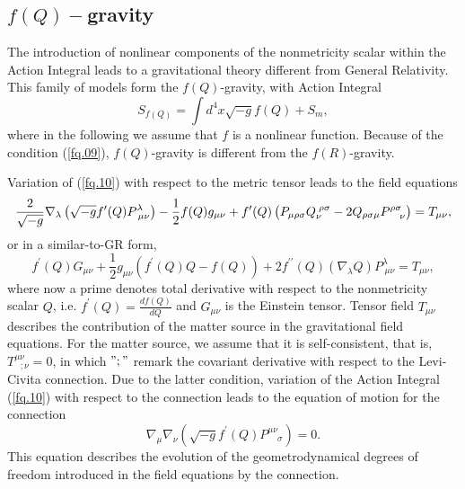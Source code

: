 \documentclass[onecolumn,superscriptaddress,secnumarabic,nobibnotes,aps,prd,nofootinbib,altaffilletter,11pt]{revtex4}
\begin{document}
\subsection{$f\left( Q\right) -$gravity}

The introduction of nonlinear components of the nonmetricity scalar within the Action Integral leads to a gravitational theory different from General Relativity. This family of models form the $f\left( Q\right) $-gravity, with
Action Integral \cite{fq1,fq2}%
\begin{equation}
S_{f\left( Q\right) }=\int d^{4}x\sqrt{-g}f\left( Q\right) +S_{m},
\label{fq.10}
\end{equation}%
where in the following we assume that $f$ is a nonlinear function. Because
of the condition (\ref{fq.09}), $f\left(Q\right) $-gravity is different from the $f\left(R\right) $-gravity.

Variation of (\ref{fq.10}) with respect to the metric tensor leads to the field equations 
\begin{equation}
\frac{2}{\sqrt{-g}}\nabla _{\lambda }\left( \sqrt{-g}f^{\prime }(Q)P_{\;\mu
\nu }^{\lambda }\right) -\frac{1}{2}f(Q)g_{\mu \nu }+f^{\prime }(Q)\left( P_{\mu \rho \sigma }Q_{\nu }^{\;\rho \sigma }-2Q_{\rho \sigma \mu }P_{%
\phantom{\rho\sigma}\nu }^{\rho \sigma }\right) =T_{\mu \nu },  \label{fq.11}
\end{equation}%
or in a similar-to-GR form,
\begin{equation}
f^{\prime }(Q)G_{\mu \nu }+\frac{1}{2}g_{\mu \nu }\left( f^{\prime
}(Q)Q-f(Q)\right) +2f^{\prime \prime }(Q)\left( \nabla _{\lambda }Q\right)
P_{\;\mu \nu }^{\lambda }=T_{\mu \nu },  \label{fq.12}
\end{equation}%
where now a prime denotes total derivative with respect to the nonmetricity
scalar $Q$, i.e. $f^{\prime }(Q)=\frac{df\left( Q\right) }{dQ}$ and $G_{\mu
\nu }$ is the Einstein tensor. Tensor field $T_{\mu \nu }$ describes the
contribution of the matter source in the gravitational field equations. For
the matter source, we assume that it is self-consistent, that is, $%
T_{~~~;\nu }^{\mu \nu }=0$, in which $";"$ remark the covariant derivative with respect to the Levi-Civita connection. Due to the latter condition, variation of the Action Integral (\ref{fq.10})
with respect to the connection leads to the equation of motion for the
connection %
\begin{equation}
\nabla _{\mu }\nabla _{\nu }\left( \sqrt{-g}f^{\prime }(Q)P_{\phantom{\mu\nu}%
\sigma }^{\mu \nu }\right) =0.  \label{fq.13}
\end{equation}%
This equation describes the evolution of the geometrodynamical degrees of
freedom introduced in the field equations by the connection.
\end{document}

